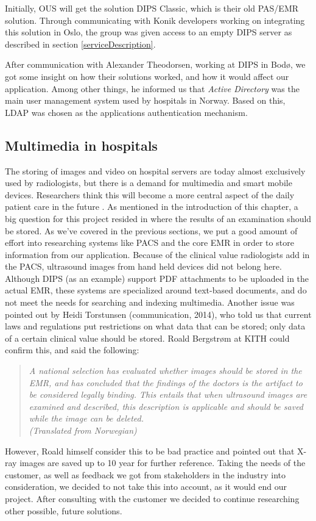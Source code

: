 Initially, OUS  will get the solution DIPS Classic, which is their old PAS/EMR solution. Through communicating with Konik developers working on integrating this solution in Oslo, the group was given access to an empty DIPS server as described in section \ref{serviceDescription}. 

After communication with Alexander Theodorsen, working at DIPS in Bodø, we got some insight on how their solutions worked, and how it would affect our application. Among other things, he informed us that \emph{Active Directory} was the main user management system used by hospitals in Norway. Based on this, LDAP was chosen as the applications authentication mechanism.



\subsection{Multimedia in hospitals}
\label{multimediaInHospitals}
The storing of images and video on hospital servers are today almost exclusively used by radiologists, but there is a demand for multimedia and smart mobile devices. Researchers think this will become a more central aspect of the daily patient care in the future \cite{indremedisineren}. As mentioned in the introduction of this chapter, a big question for this project resided in where the results of an examination should be stored. As we've covered in the previous sections, we put a good amount of effort into researching systems like PACS and the core EMR in order to store information from our application. Because of the clinical value radiologists add in the PACS, ultrasound images from hand held devices did not belong here. Although DIPS (as an example) support PDF attachments to be uploaded in the actual EMR, these systems are specialized around text-based documents, and do not meet the needs for searching and indexing multimedia. Another issue was pointed out by Heidi Torstunsen (communication, 2014), who told us that current laws and regulations put restrictions on what data that can be stored; only data of a certain clinical value should be stored. Roald Bergstrøm at KITH could confirm this, and said the following:
\newpage
\begin{quote} 
\textit{A national selection has evaluated whether images should be stored in the EMR, and has concluded that the findings of the doctors is the artifact to be considered legally binding. This entails that when ultrasound images are examined and described, this description is applicable and should be saved while the image can be deleted. \\(Translated from Norwegian)}
\end{quote}
\noindent
However, Roald himself consider this to be bad practice and pointed out that X-ray images are saved up to 10 year for further reference. Taking the needs of the customer, as well as feedback we got from stakeholders in the industry into consideration, we decided to not take this into account, as it would end our project. After consulting with the customer we decided to continue researching other possible, future solutions. 

